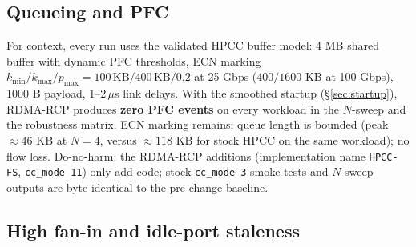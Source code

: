 \documentclass[conference]{IEEEtran}
\newcommand{\hpccfs}{\textsc{RDMA-RCP}\xspace}
\begin{document}
\subsection{Queueing and PFC}
\label{sec:queue}

For context, every run uses the validated HPCC buffer model: 4 MB shared buffer with dynamic
PFC thresholds, ECN marking $k_{\min}/k_{\max}/p_{\max} = 100\,\mathrm{KB}/400\,\mathrm{KB}/0.2$
at 25 Gbps ($400/1600$ KB at 100 Gbps), 1000 B payload, $1$--$2\,\mu$s link delays. With the
smoothed startup (\S\ref{sec:startup}), \hpccfs produces \textbf{zero PFC events} on
every workload in the $N$-sweep and the robustness matrix. ECN marking remains; queue length is
bounded (peak ${\approx}46$ KB at $N=4$, versus ${\approx}118$ KB for stock HPCC on the same
workload); no flow loss. Do-no-harm: the \hpccfs additions (implementation name
\texttt{HPCC-FS}, \texttt{cc\_mode 11}) only add code; stock \texttt{cc\_mode 3} smoke
tests and $N$-sweep outputs are byte-identical to the pre-change baseline.

\subsection{High fan-in and idle-port staleness}
\label{sec:fanin}
\end{document}
